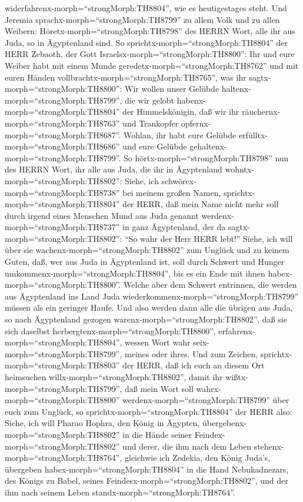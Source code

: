 widerfahrenx-morph=``strongMorph:TH8804'', wie es heutigestages steht.
 Und Jeremia sprachx-morph=``strongMorph:TH8799'' zu allem
Volk und zu allen Weibern: Höretx-morph=``strongMorph:TH8798'' des HERRN
Wort, alle ihr aus Juda, so in Ägyptenland sind.  So
sprichtx-morph=``strongMorph:TH8804'' der HERR Zebaoth, der Gott
Israelsx-morph=``strongMorph:TH8800'': Ihr und eure Weiber habt mit
einem Munde geredetx-morph=``strongMorph:TH8762'' und mit euren Händen
vollbrachtx-morph=``strongMorph:TH8765'', was ihr
sagtx-morph=``strongMorph:TH8800'': Wir wollen unser Gelübde
haltenx-morph=``strongMorph:TH8799'', die wir gelobt
habenx-morph=``strongMorph:TH8804'' der Himmelskönigin, daß wir ihr
räuchernx-morph=``strongMorph:TH8763'' und Trankopfer
opfernx-morph=``strongMorph:TH8687''. Wohlan, ihr habt eure Gelübde
erfülltx-morph=``strongMorph:TH8686'' und eure Gelübde
gehaltenx-morph=``strongMorph:TH8799''.  So
hörtx-morph=``strongMorph:TH8798'' nun des HERRN Wort, ihr alle aus
Juda, die ihr in Ägyptenland wohntx-morph=``strongMorph:TH8802'': Siehe,
ich schwörex-morph=``strongMorph:TH8738'' bei meinem großen Namen,
sprichtx-morph=``strongMorph:TH8804'' der HERR, daß mein Name nicht mehr
soll durch irgend eines Menschen Mund aus Juda genannt
werdenx-morph=``strongMorph:TH8737'' in ganz Ägyptenland, der da
sagtx-morph=``strongMorph:TH8802'': ``So wahr der Herr HERR lebt!''
 Siehe, ich will über sie
wachenx-morph=``strongMorph:TH8802'' zum Unglück und zu keinem Guten,
daß, wer aus Juda in Ägyptenland ist, soll durch Schwert und Hunger
umkommenx-morph=``strongMorph:TH8804'', bis es ein Ende mit ihnen
habex-morph=``strongMorph:TH8800''.  Welche aber dem
Schwert entrinnen, die werden aus Ägyptenland ins Land Juda
wiederkommenx-morph=``strongMorph:TH8799'' müssen als ein geringer
Haufe. Und also werden dann alle die übrigen aus Juda, so nach
Ägyptenland gezogen warenx-morph=``strongMorph:TH8802'', daß sie sich
daselbst herbergtenx-morph=``strongMorph:TH8800'',
erfahrenx-morph=``strongMorph:TH8804'', wessen Wort wahr
seix-morph=``strongMorph:TH8799'', meines oder ihres.  Und
zum Zeichen, sprichtx-morph=``strongMorph:TH8803'' der HERR, daß ich
euch an diesem Ort heimsuchen willx-morph=``strongMorph:TH8802'', damit
ihr wißtx-morph=``strongMorph:TH8799'', daß mein Wort soll
wahrx-morph=``strongMorph:TH8800'' werdenx-morph=``strongMorph:TH8799''
über euch zum Unglück,  so
sprichtx-morph=``strongMorph:TH8804'' der HERR also: Siehe, ich will
Pharao Hophra, den König in Ägypten,
übergebenx-morph=``strongMorph:TH8802'' in die Hände seiner
Feindex-morph=``strongMorph:TH8802'' und derer, die ihm nach dem Leben
stehenx-morph=``strongMorph:TH8764'', gleichwie ich Zedekia, den König
Juda's, übergeben habex-morph=``strongMorph:TH8804'' in die Hand
Nebukadnezars, des Königs zu Babel, seines
Feindesx-morph=``strongMorph:TH8802'', und der ihm nach seinem Leben
standx-morph=``strongMorph:TH8764''.

